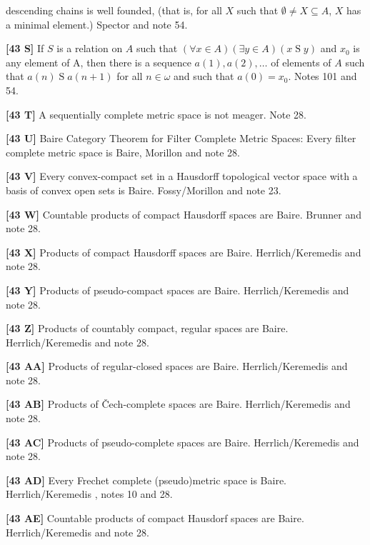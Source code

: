 descending chains is well founded, (that is, for all $X$ such that
$\emptyset\neq X\subseteq A$, $X$ has a minimal element.)
\ac{Spector} \cite{1980} and note 54.
\smallskip
\item{}{\bf [43 S]}  If $S$ is a relation on $A$ such that
$(\forall x \in A)( \exists y \in A)(x \mathrel S y)$ and $x_0$ is any
element of A, then there is a sequence $a(1),a(2),\ldots $ of
elements of $A$ such that $a(n) \mathrel S a(n+1)$ for all
$n \in  \omega $ and such that $a(0) = x_0$. Notes 101 and 54.
\smallskip
\item{}{\bf [43 T]} A sequentially complete metric space is not meager.
Note 28.
\smallskip
\item{}{\bf [43 U]} Baire Category Theorem for Filter Complete Metric
Spaces:  Every filter complete metric space is Baire, \ac{Morillon}
\cite{1988} and note 28.
\smallskip
\item{}{\bf [43 V]}  Every convex-compact set in a Hausdorff topological
vector space with a basis of convex open sets is Baire.
\ac{Fossy/Morillon} \cite{1998} and note 23.
\smallskip
\item{}{\bf [43 W]} Countable products of compact Hausdorff spaces are
Baire.  \ac{Brunner} \cite{1983c} and note 28.
\smallskip
\item{}{\bf [43 X]} Products of compact Hausdorff spaces are Baire.
\ac{Herrlich/Keremedis} \cite{1999} and note 28.
\smallskip
\item{}{\bf [43 Y]} Products of pseudo-compact spaces are Baire.
\ac{Herrlich/Keremedis} \cite{1999} and note 28.
\smallskip
\item{}{\bf [43 Z]} Products of countably compact, regular spaces are
Baire.  \ac{Herrlich/Keremedis} \cite{1999} and note 28.
\smallskip
\item{}{\bf [43 AA]} Products of regular-closed spaces are Baire.
\ac{Herrlich/Keremedis} \cite{1999} and note 28.
\smallskip
\item{}{\bf [43 AB]} Products of \v Cech-complete spaces are Baire.
\ac{Herrlich/Keremedis} \cite{1999} and note 28.
\smallskip
\item{}{\bf [43 AC]} Products of pseudo-complete spaces are Baire.
\ac{Herrlich/Keremedis} \cite{1999} and note 28.
\smallskip
\item{}{\bf [43 AD]} Every Frechet complete (pseudo)metric space is Baire.
\ac{Herrlich/Keremedis} \cite{1999a}, notes 10 and 28.
\smallskip
\item{}{\bf [43 AE]} Countable products of compact Hausdorf spaces are
Baire. \ac{Herrlich/Keremedis} \cite{1999a} and note 28.
